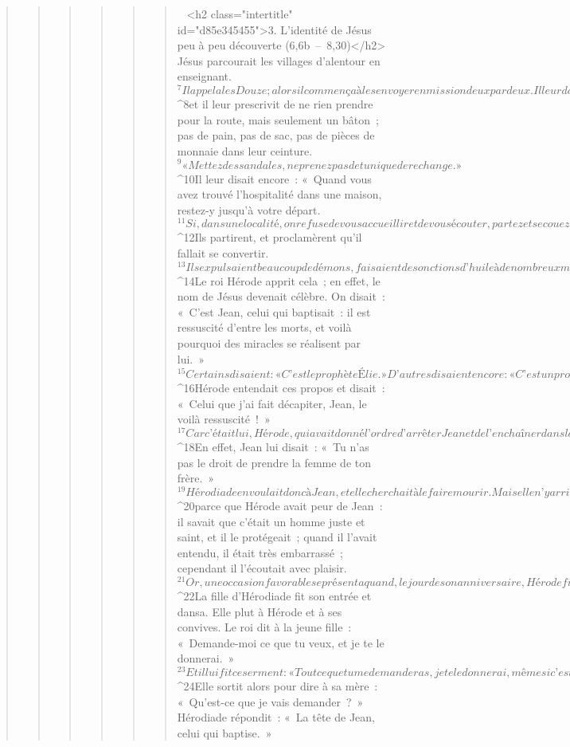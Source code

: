 \begin{verse}
\begin{verse}
\begin{verse}
\begin{verse}
\begin{verse}
\begin{verse}
         
      <h2 class="intertitle" id="d85e345455">3. L’identité de Jésus peu à peu découverte (6,6b – 8,30)</h2>
      Jésus parcourait les villages d’alentour en enseignant. 
${}^{7}Il appela les Douze ; alors il commença à les envoyer en mission deux par deux. Il leur donnait autorité sur les esprits impurs, 
${}^{8}et il leur prescrivit de ne rien prendre pour la route, mais seulement un bâton ; pas de pain, pas de sac, pas de pièces de monnaie dans leur ceinture. 
${}^{9}« Mettez des sandales, ne prenez pas de tunique de rechange. » 
${}^{10}Il leur disait encore : « Quand vous avez trouvé l’hospitalité dans une maison, restez-y jusqu’à votre départ. 
${}^{11}Si, dans une localité, on refuse de vous accueillir et de vous écouter, partez et secouez la poussière de vos pieds : ce sera pour eux un témoignage. » 
${}^{12}Ils partirent, et proclamèrent qu’il fallait se convertir. 
${}^{13}Ils expulsaient beaucoup de démons, faisaient des onctions d’huile à de nombreux malades, et les guérissaient.
${}^{14}Le roi Hérode apprit cela ; en effet, le nom de Jésus devenait célèbre. On disait : « C’est Jean, celui qui baptisait : il est ressuscité d’entre les morts, et voilà pourquoi des miracles se réalisent par lui. » 
${}^{15}Certains disaient : « C’est le prophète Élie. » D’autres disaient encore : « C’est un prophète comme ceux de jadis. » 
${}^{16}Hérode entendait ces propos et disait : « Celui que j’ai fait décapiter, Jean, le voilà ressuscité ! »
${}^{17}Car c’était lui, Hérode, qui avait donné l’ordre d’arrêter Jean et de l’enchaîner dans la prison, à cause d’Hérodiade, la femme de son frère Philippe, que lui-même avait prise pour épouse. 
${}^{18}En effet, Jean lui disait : « Tu n’as pas le droit de prendre la femme de ton frère. » 
${}^{19}Hérodiade en voulait donc à Jean, et elle cherchait à le faire mourir. Mais elle n’y arrivait pas 
${}^{20}parce que Hérode avait peur de Jean : il savait que c’était un homme juste et saint, et il le protégeait ; quand il l’avait entendu, il était très embarrassé ; cependant il l’écoutait avec plaisir.
${}^{21}Or, une occasion favorable se présenta quand, le jour de son anniversaire, Hérode fit un dîner pour ses dignitaires, pour les chefs de l’armée et pour les notables de la Galilée. 
${}^{22}La fille d’Hérodiade fit son entrée et dansa. Elle plut à Hérode et à ses convives. Le roi dit à la jeune fille : « Demande-moi ce que tu veux, et je te le donnerai. » 
${}^{23}Et il lui fit ce serment : « Tout ce que tu me demanderas, je te le donnerai, même si c’est la moitié de mon royaume. » 
${}^{24}Elle sortit alors pour dire à sa mère : « Qu’est-ce que je vais demander ? » Hérodiade répondit : « La tête de Jean, celui qui baptise. » 

\end{verse}
\end{verse}
\end{verse}
\end{verse}
\end{verse}
\end{verse}
